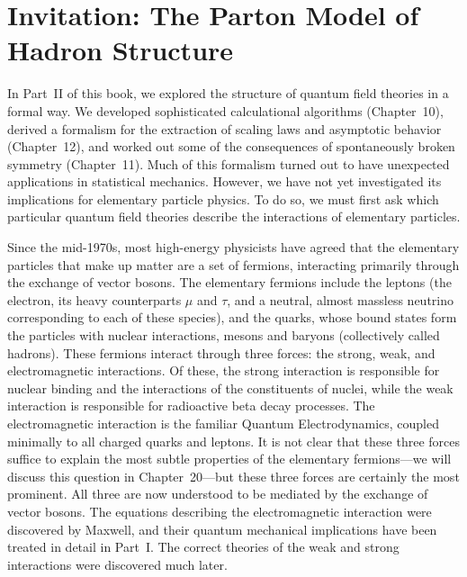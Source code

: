 \chapter{Invitation: The Parton Model of Hadron Structure}

In Part~II of this book, we explored the structure of quantum field theories
in a formal way.  We developed sophisticated calculational algorithms
(Chapter~10), derived a formalism for the extraction of scaling laws and
asymptotic behavior (Chapter~12), and worked out some of the consequences of
spontaneously broken symmetry (Chapter~11).  Much of this formalism turned
out to have unexpected applications in statistical mechanics.  However, we
have not yet investigated its implications for elementary particle physics.
To do so, we must first ask which particular quantum field theories describe
the interactions of elementary particles.

Since the mid-1970s, most high-energy physicists have agreed that the
elementary particles that make up matter are a set of fermions, interacting
primarily through the exchange of vector bosons.  The elementary fermions
include the leptons (the electron, its heavy counterparts $\mu$ and $\tau$, and
a neutral, almost massless neutrino corresponding to each of these species),
and the quarks, whose bound states form the particles with nuclear
interactions, mesons and baryons (collectively called hadrons).  These
fermions interact through three forces: the strong, weak, and electromagnetic
interactions.  Of these, the strong interaction is responsible for nuclear
binding and the interactions of the constituents of nuclei, while the weak
interaction is responsible for radioactive beta decay processes.  The
electromagnetic interaction is the familiar Quantum Electrodynamics, coupled
minimally to all charged quarks and leptons.  It is not clear that these three
forces suffice to explain the most subtle properties of the elementary
fermions---we will discuss this question in Chapter~20---but these three
forces are certainly the most prominent.  All three are now understood to be
mediated by the exchange of vector bosons.  The equations describing the
electromagnetic interaction were discovered by Maxwell, and their quantum
mechanical implications have been treated in detail in Part~I.  The correct
theories of the weak and strong interactions were discovered much later.

